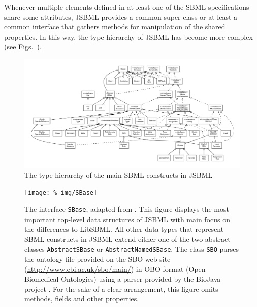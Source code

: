 \documentclass[
  BCOR12mm,
  letterpaper,
  11pt,
  headsepline,
  pointlessnumbers,
  tablecaptionabove,
  onelinecaption,
  headinclude,
  appendixprefix,
  idxtotoc,
  bibtotoc,
  twoside,
  titlepage
]{scrartcl}
\begin{document}
Whenever multiple elements defined in at least one of the SBML specifications \citep{Hucka2003, Hucka2008, Hucka2010a} share some
attributes, JSBML provides a common super class or at least a common interface
that gathers methods for manipulation of the shared properties. In this way, the
type hierarchy of JSBML has become more complex (see
Figs.~).
\begin{figure}
\centering
\includegraphics[width=\textwidth]{img/FullTypeHierarchy.pdf}
\caption[The type hierarchy in JSBML]{The type hierarchy of the main SBML
constructs in JSBML}
\label{fig:TypeHierarchy}
\end{figure}
\begin{figure}[htb]
 \centering
 \texttt{[image: \%
img/SBase]}
 \caption[The interface \texttt{SBase}]{The interface \texttt{SBase}, adapted
from \citep{Draeger2011}. This figure displays the most important top-level data
structures of JSBML with main focus on the differences to LibSBML. All other
data types that represent SBML constructs in JSBML extend either one of the two
abstract classes \texttt{AbstractSBase} or \texttt{AbstractNamedSBase}. The
class \texttt{SBO} parses the ontology file provided on the SBO web
site (\url{http://www.ebi.ac.uk/sbo/main/}) in OBO format (Open
Biomedical Ontologies) using a parser provided by the BioJava project
\citep{Holland2008}. For the sake of a clear arrangement, this figure omits
methods, fields and other properties.}
 \label{fig:SBase}
\end{figure}
\end{document}
